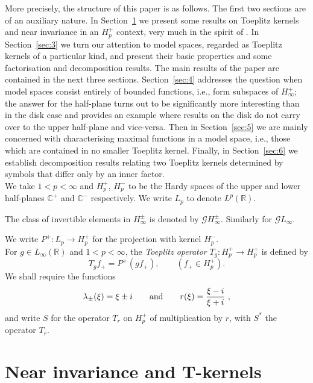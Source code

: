 \documentclass[11pt]{article}
\def\CC{\mathbb{C}}
\def\GG{\mathcal{G}}
\def\RR{\mathbb{R}}
\def\Hp{H_p^+}
\numberwithin{equation}{section}
\def\beq{\begin{equation}}
\def\eeq{\end{equation}}
\begin{document}
More precisely, the structure of this paper is as follows. The first two sections are of an auxiliary nature. In Section~\ref{sec:2} we present some results
on Toeplitz kernels and near invariance in an $H_p^+$ context, very much in the spirit of \cite{CP14}.
In Section~\ref {sec:3} we turn our attention to model spaces, regarded as
Toeplitz kernels of a particular kind, and present their basic properties and some factorisation and decomposition
results. The main results of the paper are contained in the next three sections. Section~\ref{sec:4} addresses the question when model spaces consist entirely of
bounded functions, i.e., form subspaces of $H_\infty^+$; the answer for the
half-plane turns out to be significantly more interesting than in the disk case and provides an example where results on the disk do not carry over to the upper half-plane and vice-versa.
Then in Section~\ref{sec:5} we are mainly concerned with characterising maximal functions in a model space, i.e., those which are
contained in no smaller Toeplitz kernel.
Finally, in Section~\ref{sec:6} we  establish decomposition results relating two Toeplitz kernels 
determined by symbols that differ only by an inner factor.\\




We take $1<p<\infty$ and $H_p^+$, $H_p^-$ to be the Hardy spaces of the upper and lower half-planes $\CC^+$ and $\CC^-$ respectively.
We write $L_p$ to denote $L^p(\RR)$. 

The class of invertible elements in $H_\infty^\pm$ is denoted by $\GG H_\infty^\pm$. Similarly for $\GG L_\infty$.

We write $P^+:L_p  \to H^+_p$ for the projection
with kernel $H^-_p$.\\

For $g \in L_\infty(\RR)$  and $1<p<\infty$,  the {\em Toeplitz operator\/}
$T_g: H^+_p \to H^+_p$ is defined by
\[
T_g f_+ = P^+(g f_+), \qquad (f_+ \in H^+_p).
\]
We shall require the functions
\beq \label {eq:1.1}
\lambda_{\pm}(\xi)= \xi \pm i \qquad \hbox{and} \qquad r(\xi)= \frac{\xi-i}{\xi+i}\,\,,
\eeq
 and write $S$ for the operator $T_r$ on $\Hp$  of multiplication by $r$, with $S^*$ the
operator $T_{\overline r}$.


\section{Near invariance and T-kernels}
\label{sec:2}
\end{document}
